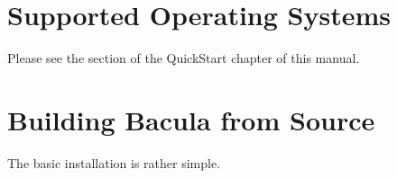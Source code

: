 \section{Supported Operating Systems}
\label{Systems}

Please see the 
 section
of the QuickStart chapter of this manual. 

\section{Building Bacula from Source}
\label{Building}

The basic installation is rather simple. 

